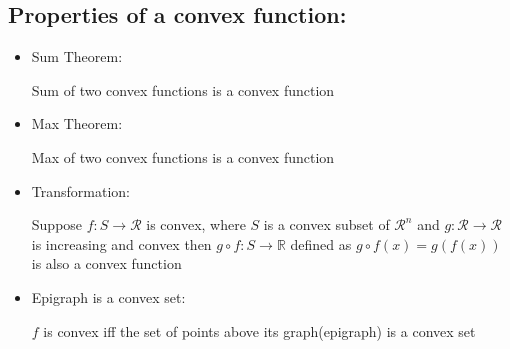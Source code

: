 \documentclass[12pt,a4paper]{article}
\begin{document}
\subsection{Properties of a convex function:}
\begin{itemize}
    \item Sum Theorem:
    
    Sum of two convex functions is a convex function
    \item Max Theorem:
    
    Max of two convex functions is a convex function
    \item Transformation:
    
    Suppose \(f: S \rightarrow \mathcal{R}\) is convex, where \(S\) is a convex subset of \(\mathcal{R}^n\) and \(g: \mathcal{R} \rightarrow \mathcal{R}\) is increasing and convex then \(g \circ f: S \rightarrow \mathbb{R}\) defined as \(g \circ f(x)=g(f(x))\) is also a convex function
    \item Epigraph is a convex set:
    
    \(f\) is convex iff the set of points above its graph(epigraph) is a convex set
\end{itemize}
\end{document}
